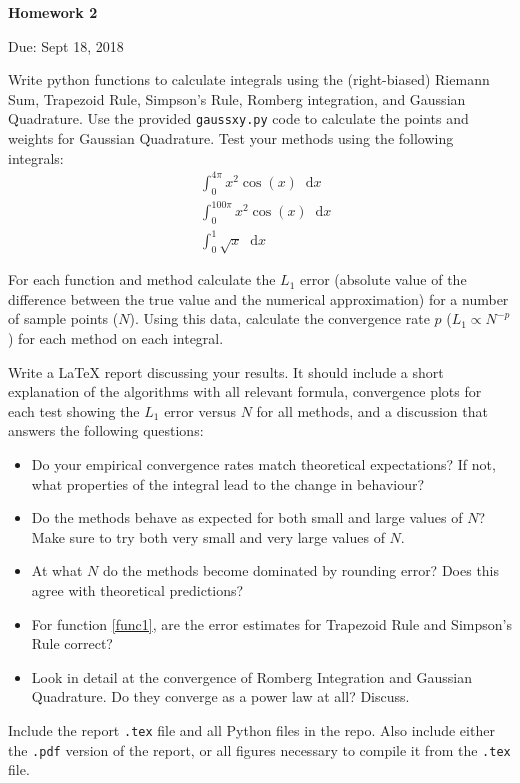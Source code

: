 \documentclass{article}
\newcommand*\diff{\mathop{}\!\mathrm{d}}
\begin{document}
\begin{center}

\vspace*{-2.5cm}
\LARGE
\bf{Homework 2}
\vspace{1cm}

\large{Due: Sept 18, 2018}
\vspace{1cm}

\end{center}

Write python functions to calculate integrals using the (right-biased) Riemann Sum, Trapezoid Rule, Simpson's Rule, Romberg integration, and Gaussian Quadrature.  Use the provided \texttt{gaussxy.py} code to calculate the points and weights for Gaussian Quadrature.  Test your methods using the following integrals:
\begin{align}
& \int_0^{4\pi} x^2 \cos(x) \diff x \label{func1}\\
& \int_0^{100\pi} x^2 \cos(x) \diff x \\
& \int_0^1 \sqrt{x} \diff x 
\end{align}

For each function and method calculate the $L_1$ error (absolute value of the difference between the true value and the numerical approximation) for a number of sample points ($N$).  Using this data, calculate the convergence rate $p$ ($L_1 \propto N^{-p}$) for each method on each integral.

Write a \LaTeX{}  report discussing your results. It should include a short explanation of the algorithms with all relevant formula, convergence plots for each test showing the $L_1$ error versus $N$ for all methods, and a discussion that answers the following questions:
\begin{itemize}
	\item Do your empirical convergence rates match theoretical expectations? If not, what properties of the integral lead to the change in behaviour?
	\item Do the methods behave as expected for both small and large values of $N$?  Make sure to try both very small and very large values of $N$.
	\item At what $N$ do the methods become dominated by rounding error?  Does this agree with theoretical predictions?
	\item For function \ref{func1}, are the error estimates for Trapezoid Rule and Simpson's Rule correct?
	\item Look in detail at the convergence of Romberg Integration and Gaussian Quadrature. Do they converge as a power law at all? Discuss.
\end{itemize}

Include the report \texttt{.tex} file and all Python files in the repo.  Also include either the \texttt{.pdf} version of the report, or all figures necessary to compile it from the \texttt{.tex} file.
\end{document}

